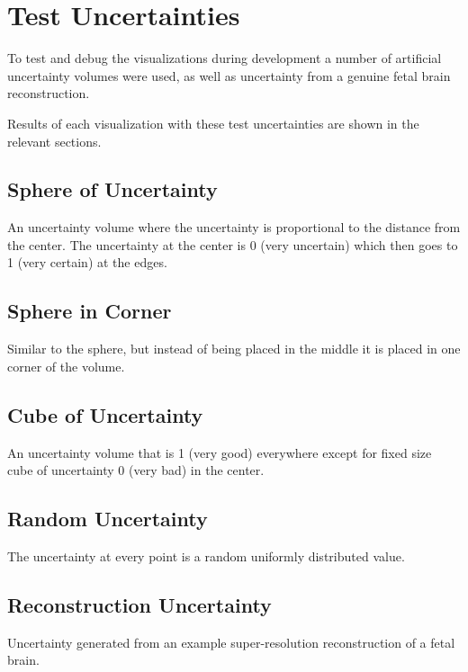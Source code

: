 \newpage
\section{Test Uncertainties}\label{section:testuncertainties}

To test and debug the visualizations during development a number of artificial uncertainty volumes were used, as well as uncertainty from a genuine fetal brain reconstruction.

Results of each visualization with these test uncertainties are shown in the relevant sections.

\subsection*{Sphere of Uncertainty}
An uncertainty volume where the uncertainty is proportional to the distance from the center. The uncertainty at the center is 0 (very uncertain) which then goes to 1 (very certain) at the edges.

\subsection*{Sphere in Corner}
Similar to the sphere, but instead of being placed in the middle it is placed in one corner of the volume.

\subsection*{Cube of Uncertainty}
An uncertainty volume that is 1 (very good) everywhere except for fixed size cube of uncertainty 0 (very bad) in the center.

\subsection*{Random Uncertainty}
The uncertainty at every point is a random uniformly distributed value.

\subsection*{Reconstruction Uncertainty}
Uncertainty generated from an example super-resolution reconstruction of a fetal brain.\\

